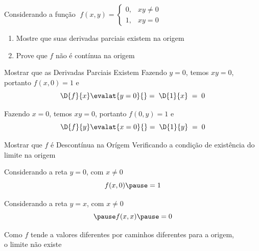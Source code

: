 \begin{question}
  Considerando a função
  \(\;
    f(x, y) = \begin{cases}
      0, & xy \neq 0 \\
      1, & xy = 0
    \end{cases}
  \) \\[5mm]
  \begin{enumerate}
    \item Mostre que suas derivadas parciais existem na origem \\[3mm]
    \item Prove que $f$ não é contínua na origem
  \end{enumerate}
\end{question}

\begin{resolution}{Mostrar que as Derivadas Parciais Existem}
  Fazendo $y=0$,
  \pause
  temos $xy=0$,
  \pause
  portanto \(f(x, 0) = 1\)
  \pause
  e
  \[
    \D{f}{x}\evalat{y=0}{}
    =\; \D{1}{x}
    \;=\; 0
  \]

  \pause
  \bigskip
  Fazendo $x=0$,
  \pause
  temos $xy=0$,
  \pause
  portanto \(f(0, y) = 1\)
  \pause
  e
  \[
    \D{f}{y}\evalat{x=0}{}
    =\; \D{1}{y}
    \;=\; 0
  \]

\end{resolution}

\begin{resolution}{Mostrar que $f$ é Descontínua na Orígem}
  Verificando a condição de existência do limite na origem

  \pause
  Considerando a reta $y=0$, com $x\neq 0$
  \pause
  \[
    f(x, 0)
    \pause
    = 1
  \]

  \pause
  Considerando a reta $y=x$, com $x\neq 0$
  \[
    \pause
    f(x, x)
    \pause
    = 0
  \]

  \pause
  Como $f$ tende a valores diferentes por
  caminhos diferentes para a origem,\\
  o limite não existe
\end{resolution}


